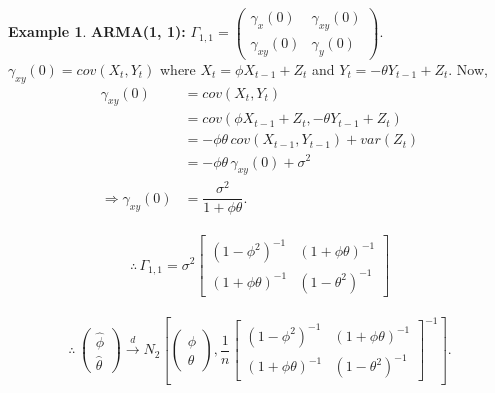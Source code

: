 \documentclass[11pt, a4paper]{article}
\numberwithin{equation}{section}
\theoremstyle{definition}
\newtheorem{example}{Example}[subsection]
\begin{document}
\begin{example}
\textbf{ARMA(1, 1):} $\Gamma_{1, 1} = \begin{pmatrix}
\gamma_x (0) & \gamma_{xy} (0) \\ \gamma_{xy} (0) & \gamma_y (0)
\end{pmatrix}$. $\gamma_{xy} (0) = cov(X_t, Y_t)$ where $X_t = \phi X_{t-1} + Z_t$ and $Y_t = - \theta Y_{t-1} + Z_t$. Now,
\begin{align*}
\gamma_{xy} (0) &= cov(X_t, Y_t) \\[0.3em]
&= cov(\phi X_{t-1} + Z_t, - \theta Y_{t-1} + Z_t) \\[0.3em]
&= - \phi \theta \, cov(X_{t-1}, Y_{t-1}) + var(Z_t) \\[0.3em]
&= - \phi \theta \, \gamma_{xy} (0) + \sigma^2 \\[0.3em]
\Rightarrow \gamma_{xy} (0) &= \dfrac{\sigma^2}{1 + \phi \theta}.
\end{align*}

\begin{align*}
\therefore \, \Gamma_{1, 1} = \sigma^2 \begin{bmatrix}
(1 - \phi^2)^{-1} & (1 + \phi \theta)^{-1} \\[0.3em] (1 + \phi \theta)^{-1} & (1 - \theta^2)^{-1}
\end{bmatrix}
\end{align*}

\begin{align}
\therefore \, \begin{pmatrix} \hat{\phi} \\[0.3em] \hat{\theta} \end{pmatrix} \overset{d}{\rightarrow} N_2 \left[ \begin{pmatrix} \phi \\[0.3em] \theta \end{pmatrix},  \dfrac{1}{n} \begin{bmatrix} (1 - \phi^2)^{-1} & (1 + \phi \theta)^{-1} \\[0.3em] (1 + \phi \theta)^{-1} & (1 - \theta^2)^{-1} \end{bmatrix}^{-1} \right].
\end{align}
\end{example}
\end{document}
